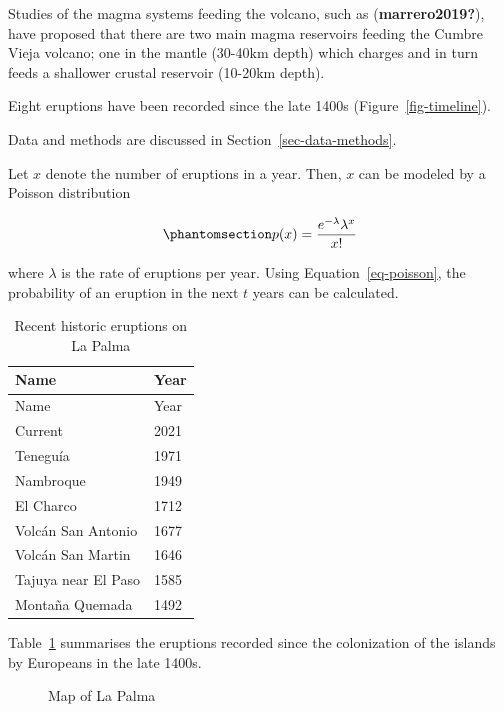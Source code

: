 \documentclass[
]{agujournal2019}
\begin{document}
Studies of the magma systems feeding the volcano, such as
(\textbf{marrero2019?}), have proposed that there are two main magma
reservoirs feeding the Cumbre Vieja volcano; one in the mantle (30-40km
depth) which charges and in turn feeds a shallower crustal reservoir
(10-20km depth).

Eight eruptions have been recorded since the late 1400s
(Figure~\ref{fig-timeline}).

Data and methods are discussed in Section~\ref{sec-data-methods}.

Let \(x\) denote the number of eruptions in a year. Then, \(x\) can be
modeled by a Poisson distribution

\begin{equation}\phantomsection\label{eq-poisson}{
p(x) = \frac{e^{-\lambda} \lambda^{x}}{x !}
}\end{equation}

where \(\lambda\) is the rate of eruptions per year. Using
Equation~\ref{eq-poisson}, the probability of an eruption in the next
\(t\) years can be calculated.

\begin{longtable}[]{@{}ll@{}}
\caption{Recent historic eruptions on La
Palma}\label{tbl-history}\tabularnewline
\toprule\noalign{}
Name & Year \\
\midrule\noalign{}
\endfirsthead
\toprule\noalign{}
Name & Year \\
\midrule\noalign{}
\endhead
\bottomrule\noalign{}
\endlastfoot
Current & 2021 \\
Teneguía & 1971 \\
Nambroque & 1949 \\
El Charco & 1712 \\
Volcán San Antonio & 1677 \\
Volcán San Martin & 1646 \\
Tajuya near El Paso & 1585 \\
Montaña Quemada & 1492 \\
\end{longtable}

Table~\ref{tbl-history} summarises the eruptions recorded since the
colonization of the islands by Europeans in the late 1400s.

\begin{figure}


\caption{\label{fig-map}Map of La Palma}

\end{figure}%
\end{document}
